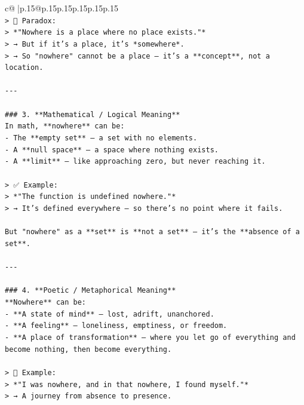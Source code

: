 \documentclass{article}
\begin{document}
{\begin{supertabular}{c@{$\;$}|p{.15\linewidth}@{}p{.15\linewidth}p{.15\linewidth}p{.15\linewidth}p{.15\linewidth}p{.15\linewidth}}
{{{\\ 
\texttt{> 🤯 Paradox:  } \\
\texttt{> *"Nowhere is a place where no place exists."*  } \\
\texttt{> → But if it’s a place, it’s *somewhere*.  } \\
\texttt{> → So "nowhere" cannot be a place — it’s a **concept**, not a location.} \\
\\ 
\texttt{{-}{-}{-}} \\
\\ 
\texttt{\#\#\# 3. **Mathematical / Logical Meaning**} \\
\texttt{In math, **nowhere** can be:} \\
\texttt{{-} The **empty set** — a set with no elements.} \\
\texttt{{-} A **null space** — a space where nothing exists.} \\
\texttt{{-} A **limit** — like approaching zero, but never reaching it.} \\
\\ 
\texttt{> ✅ Example:  } \\
\texttt{> *"The function is undefined nowhere."*  } \\
\texttt{> → It’s defined everywhere — so there’s no point where it fails.} \\
\\ 
\texttt{But "nowhere" as a **set** is **not a set** — it’s the **absence of a set**.} \\
\\ 
\texttt{{-}{-}{-}} \\
\\ 
\texttt{\#\#\# 4. **Poetic / Metaphorical Meaning**} \\
\texttt{**Nowhere** can be:} \\
\texttt{{-} **A state of mind** — lost, adrift, unanchored.} \\
\texttt{{-} **A feeling** — loneliness, emptiness, or freedom.} \\
\texttt{{-} **A place of transformation** — where you let go of everything and become nothing, then become everything.} \\
\\ 
\texttt{> 🌌 Example:  } \\
\texttt{> *"I was nowhere, and in that nowhere, I found myself."*  } \\
\texttt{> → A journey from absence to presence.} \\
\\ 
}}}
\end{supertabular}}
\end{document}
